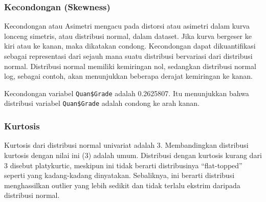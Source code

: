 \documentclass[
]{book}
\newenvironment{Shaded}{\begin{snugshade}}{\end{snugshade}}
\newcommand{\CommentTok}[1]{\textcolor[rgb]{0.56,0.35,0.01}{\textit{#1}}}
\newcommand{\KeywordTok}[1]{\textcolor[rgb]{0.13,0.29,0.53}{\textbf{#1}}}
\newcommand{\NormalTok}[1]{#1}
\newcommand{\OperatorTok}[1]{\textcolor[rgb]{0.81,0.36,0.00}{\textbf{#1}}}
\begin{document}
\hypertarget{kecondongan-skewness}{%
\subsubsection*{Kecondongan (Skewness)}\label{kecondongan-skewness}}

Kecondongan atau Asimetri mengacu pada distorsi atau asimetri dalam kurva lonceng simetris, atau distribusi normal, dalam dataset. Jika kurva bergeser ke kiri atau ke kanan, maka dikatakan condong. Kecondongan dapat dikuantifikasi sebagai representasi dari sejauh mana suatu distribusi bervariasi dari distribusi normal. Distribusi normal memiliki kemiringan nol, sedangkan distribusi normal log, sebagai contoh, akan menunjukkan beberapa derajat kemiringan ke kanan.

\begin{Shaded}
\end{Shaded}

Kecondongan variabel \texttt{Quan\$Grade} adalah 0.2625807. Itu menunjukkan bahwa distribusi variabel \texttt{Quan\$Grade} adalah condong ke arah kanan.

\hypertarget{kurtosis}{%
\subsubsection*{Kurtosis}\label{kurtosis}}

Kurtosis dari distribusi normal univariat adalah 3. Membandingkan distribusi kurtosis dengan nilai ini (3) adalah umum. Distribusi dengan kurtosis kurang dari 3 disebut platykurtic, meskipun ini tidak berarti distribusinya ``flat-topped'' seperti yang kadang-kadang dinyatakan. Sebaliknya, ini berarti distribusi menghassilkan outlier yang lebih sedikit dan tidak terlalu ekstrim daripada distribusi normal.

\begin{Shaded}
\end{Shaded}
\end{document}
